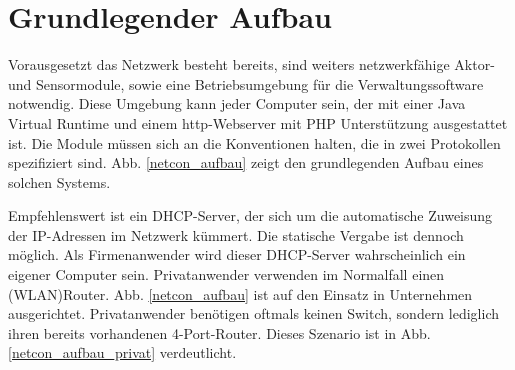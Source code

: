 \documentclass[a4paper,14pt,headsepline]{scrartcl}
\begin{document}
\newpage

\section{Grundlegender Aufbau}
Vorausgesetzt das Netzwerk besteht bereits, sind weiters netzwerkfähige Aktor- und Sensormodule, sowie eine Betriebsumgebung für die Verwaltungssoftware notwendig. Diese Umgebung kann jeder Computer sein, der mit einer Java Virtual Runtime und einem http-Webserver mit PHP Unterstützung ausgestattet ist. Die Module müssen sich an die Konventionen halten, die in zwei Protokollen spezifiziert sind. Abb. \ref{netcon_aufbau} zeigt den grundlegenden Aufbau eines solchen Systems. 

\begin{figure}[h]
\begin{center}
\end{center}
\end{figure}

\newpage

Empfehlenswert ist ein DHCP-Server, der sich um die automatische Zuweisung der IP-Adressen im Netzwerk kümmert. Die statische Vergabe ist dennoch möglich. Als Firmenanwender wird dieser DHCP-Server wahrscheinlich ein eigener Computer sein. Privatanwender verwenden im Normalfall einen \linebreak (WLAN)Router. Abb. \ref{netcon_aufbau} ist auf den Einsatz in Unternehmen ausgerichtet. Privatanwender benötigen oftmals keinen Switch, sondern lediglich ihren bereits vorhandenen 4-Port-Router. Dieses Szenario ist in Abb. \ref{netcon_aufbau_privat} verdeutlicht. 

\begin{figure}[h]
\begin{center}
\end{center}
\end{figure}
\end{document}
